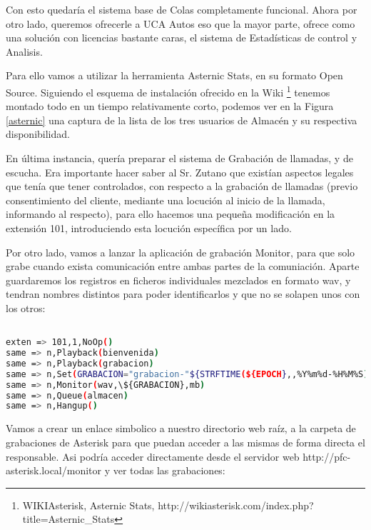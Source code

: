 Con esto quedaría el sistema base de Colas completamente funcional. Ahora por otro lado, queremos ofrecerle a UCA Autos eso que la mayor parte, ofrece como una solución con licencias bastante caras, el sistema de Estadísticas de control y Analisis.

Para ello vamos a utilizar la herramienta Asternic Stats, en su formato Open Source. Siguiendo el esquema de instalación ofrecido en la Wiki \footnote{WIKIAsterisk, Asternic Stats, http://wikiasterisk.com/index.php?title=Asternic\_Stats} \cite{website:asternic} tenemos montado todo en un tiempo relativamente corto, podemos ver en la Figura \ref{asternic} una captura de la lista de los tres usuarios de Almacén y su respectiva disponibilidad. 


En última instancia, quería preparar el sistema de Grabación de llamadas, y de escucha. Era importante hacer saber al Sr. Zutano que existían aspectos legales que tenía que tener controlados, con respecto a la grabación de llamadas (previo consentimiento del cliente, mediante una locución al inicio de la llamada, informando al respecto), para ello hacemos una pequeña modificación en la extensión 101, introduciendo esta locución específica por un lado.

Por otro lado, vamos a lanzar la aplicación de grabación Monitor, para que solo grabe cuando exista comunicación entre ambas partes de la comuniación. Aparte guardaremos los registros en ficheros individuales mezclados en formato wav, y tendran nombres distintos para poder identificarlos y que no se solapen unos con los otros:

\begin{lstlisting}[language=bash,title={/etc/asterisk/extensions.conf}]

exten => 101,1,NoOp()
same => n,Playback(bienvenida)
same => n,Playback(grabacion)
same => n,Set(GRABACION="grabacion-"${STRFTIME(${EPOCH},,%Y%m%d-%H%M%S)})
same => n,Monitor(wav,\${GRABACION},mb)
same => n,Queue(almacen)
same => n,Hangup()

\end{lstlisting}

Vamos a crear un enlace simbolico a nuestro directorio web raíz, a la carpeta de grabaciones de Asterisk para que puedan acceder a las mismas de forma directa el responsable. Asi podría acceder directamente desde el servidor web http://pfc-asterisk.local/monitor y ver todas las grabaciones:

